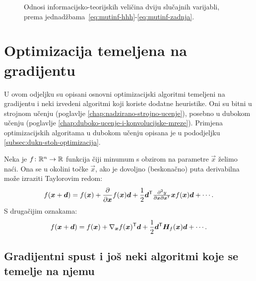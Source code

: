 \documentclass[utf8, diplomski, lmodern]{fer}
\begin{document}
\begin{figure}
\centering
{}
\caption{Odnosi informacijsko-teorijskih veličina dviju slučajnih varijabli, prema jednadžbama~\eqref{eq:mutinf-hhh}-\eqref{eq:mutinf-zadnja}.}
\label{fig:entropije}
\end{figure}


\section{Optimizacija temeljena na gradijentu}

U ovom odjeljku su opisani osnovni optimizacijski algoritmi temeljeni na gradijentu i neki izvedeni algoritmi koji koriste dodatne heuristike. Oni su bitni u strojnom učenju (poglavlje \ref{chap:nadzirano-strojno-ucenje}), posebno u dubokom učenju (poglavlje \ref{chap:duboko-ucenje-i-konvolucijske-mreze}). Primjena optimizacijskih algoritama u dubokom učenju opisana je u pododjeljku \ref{subsec:dukn-stoh-optimizacija}.

Neka je $f \colon \mathbb{R}^n \to \mathbb{R}$ funkcija čiji minumum s obzirom na parametre $\vec x$ želimo naći. Ona se u okolini točke $\vec x$, ako je dovoljno (beskonačno) puta derivabilna može izraziti Taylorovim redom:
\begin{align}
f(\vec x+\vec d) = f(\vec x) + \pd{}{\vec x}f(\vec x)\vec d + \frac{1}{2}\vec d^\tp{\tfrac{\partial^2y}{\partial\vec x\partial\vec x^\tp}}{\vec x}f(\vec x)\vec d + \cdots \text{.}
\end{align}
S drugačijim oznakama:
\begin{align} \label{eq:taylorov-red}
f(\vec x+\vec d) = f(\vec x) + \nabla_{\vec x}f(\vec x)^\tp\vec d + \frac{1}{2}\vec d^\tp\vec H_f(\vec x)\vec d + \cdots \text{.}
\end{align}

\subsection{Gradijentni spust i još neki algoritmi koje se temelje na njemu} \label{subsec:gradijenti-spust}
\end{document}

